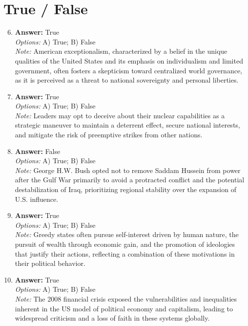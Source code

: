 \documentclass[12pt]{article}
\begin{document}
\section*{True / False}
\begin{enumerate}[label=\arabic*.]
\setcounter{enumi}{5}
\item \textbf{Answer:} True
\\ \textit{Options:} A) True; B) False
\\ \textit{Note:} American exceptionalism, characterized by a belief in the unique qualities of the United States and its emphasis on individualism and limited government, often fosters a skepticism toward centralized world governance, as it is perceived as a threat to national sovereignty and personal liberties.
\item \textbf{Answer:} True
\\ \textit{Options:} A) True; B) False
\\ \textit{Note:} Leaders may opt to deceive about their nuclear capabilities as a strategic maneuver to maintain a deterrent effect, secure national interests, and mitigate the risk of preemptive strikes from other nations.
\item \textbf{Answer:} False
\\ \textit{Options:} A) True; B) False
\\ \textit{Note:} George H.W. Bush opted not to remove Saddam Hussein from power after the Gulf War primarily to avoid a protracted conflict and the potential destabilization of Iraq, prioritizing regional stability over the expansion of U.S. influence.
\item \textbf{Answer:} True
\\ \textit{Options:} A) True; B) False
\\ \textit{Note:} Greedy states often pursue self-interest driven by human nature, the pursuit of wealth through economic gain, and the promotion of ideologies that justify their actions, reflecting a combination of these motivations in their political behavior.
\item \textbf{Answer:} True
\\ \textit{Options:} A) True; B) False
\\ \textit{Note:} The 2008 financial crisis exposed the vulnerabilities and inequalities inherent in the US model of political economy and capitalism, leading to widespread criticism and a loss of faith in these systems globally.
\end{enumerate}
\end{document}
